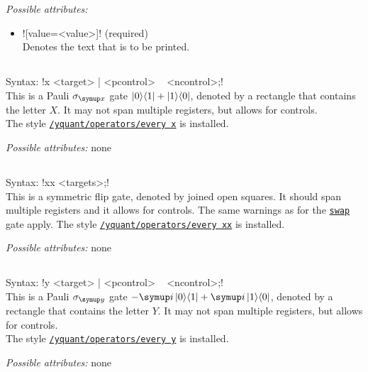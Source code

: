 \documentclass{scrartcl}
\def\gate#1{\hyperref[gate:#1]{\texttt{#1}}}
\def\style#1{\hyperref[style:#1]{\texttt{#1}}}
\def\ii{{\symup i}}
\def\ketbra#1#2{\ket{#1}\!\bra{#2}}
\begin{document}
         \emph{Possible attributes:}
         \begin{itemize}
            \item \yquant![value=<value>]! (required) \\
               Denotes the text that is to be printed.
         \end{itemize}

      \subsection{\texorpdfstring{}{x}}\label{gate:x}
         Syntax: \yquant!x <target> | <pcontrol> ~ <ncontrol>;! \\
         This is a Pauli $\sigma_{\symup x}$ gate $\ketbra01 + \ketbra10$, denoted by a rectangle that contains the letter $X$.
         It may not span multiple registers, but allows for controls. \\
         The style \style{/yquant/operators/every x} is installed.

         \emph{Possible attributes:} none

      \subsection{\texorpdfstring{}{xx}}\label{gate:xx}
         Syntax: \yquant!xx <targets>;! \\
         This is a symmetric flip gate, denoted by joined open squares.
         It should span multiple registers and it allows for controls.
         The same warnings as for the \gate{swap} gate apply.
         The style \style{/yquant/operators/every xx} is installed.

         \emph{Possible attributes:} none

      \subsection{\texorpdfstring{}{y}}\label{gate:y}
         Syntax: \yquant!y <target> | <pcontrol> ~ <ncontrol>;! \\
         This is a Pauli $\sigma_{\symup y}$ gate $-\ii\ketbra01 + \ii\ketbra10$, denoted by a rectangle that contains the letter $Y$.
         It may not span multiple registers, but allows for controls. \\
         The style \style{/yquant/operators/every y} is installed.

         \emph{Possible attributes:} none
\end{document}
